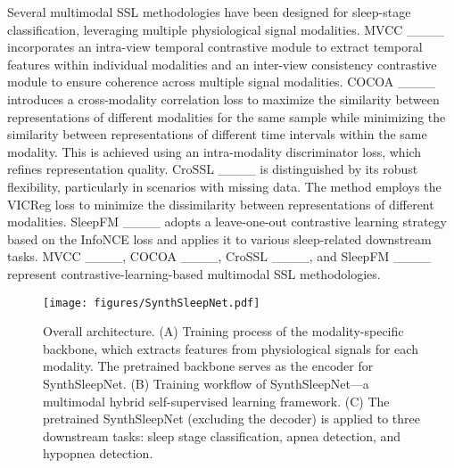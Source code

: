 Several multimodal SSL methodologies have been designed for sleep-stage classification, leveraging multiple physiological signal modalities. MVCC ____ incorporates an intra-view temporal contrastive module to extract temporal features within individual modalities and an inter-view consistency contrastive module to ensure coherence across multiple signal modalities. COCOA ____ introduces a cross-modality correlation loss to maximize the similarity between representations of different modalities for the same sample while minimizing the similarity between representations of different time intervals within the same modality. This is achieved using an intra-modality discriminator loss, which refines representation quality. CroSSL ____ is distinguished by its robust flexibility, particularly in scenarios with missing data. The method employs the VICReg loss to minimize the dissimilarity between representations of different modalities. SleepFM ____ adopts a leave-one-out contrastive learning strategy based on the InfoNCE loss and applies it to various sleep-related downstream tasks. MVCC ____, COCOA ____, CroSSL ____, and SleepFM ____ represent contrastive-learning-based multimodal SSL methodologies.


\begin{figure*}[!t]
\centering
\texttt{[image: figures/SynthSleepNet.pdf]}
\caption{Overall architecture. (A) Training process of the modality-specific backbone, which extracts features from physiological signals for each modality. The pretrained backbone serves as the encoder for SynthSleepNet. (B) Training workflow of SynthSleepNet—a multimodal hybrid self-supervised learning framework. (C) The pretrained SynthSleepNet (excluding the decoder) is applied to three downstream tasks: sleep stage classification, apnea detection, and hypopnea detection.}
\label{fig:figure1}
\end{figure*}